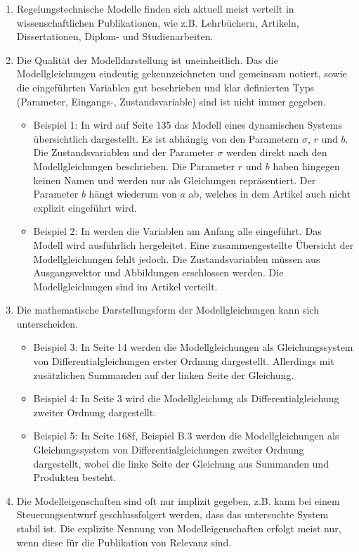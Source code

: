 \begin{enumerate}
	\item Regelungstechnische Modelle finden sich aktuell meist verteilt in wissenschaftlichen Publikationen, wie z.B. Lehrbüchern, Artikeln, Dissertationen, Diplom- und Studienarbeiten.
	\item Die Qualität der Modelldarstellung ist uneinheitlich. Das die Modellgleichungen eindeutig gekennzeichneten und gemeinsam notiert, sowie die eingeführten Variablen gut beschrieben und klar definierten Typs (Parameter, Eingangs-, Zustandsvariable) sind ist nicht immer gegeben.
	\begin{itemize}[label=$\bullet$]
		\item Beispiel 1: In \cite{LOR63} wird auf Seite 135 das Modell eines dynamischen Systems übersichtlich dargestellt. Es ist abhängig von den Parametern $\sigma$, $r$ und $b$. Die Zustandsvariablen und der Parameter $\sigma$ werden direkt nach den Modellgleichungen beschrieben. Die Parameter $r$ und $b$ haben hingegen keinen Namen und werden nur als Gleichungen repräsentiert. Der Parameter $b$ hängt wiederum von $a$ ab, welches in dem Artikel auch nicht explizit eingeführt wird.
		\item Beispiel 2: In \cite{YIFREA09} werden die Variablen am Anfang alle eingeführt. Das Modell wird ausführlich hergeleitet. Eine zusammengestellte Übersicht der Modellgleichungen fehlt jedoch. Die Zustandsvariablen müssen aus Ausgangsvektor und Abbildungen erschlossen werden. Die Modellgleichungen sind im Artikel verteilt.
	\end{itemize}
	\item Die mathematische Darstellungsform der Modellgleichungen kann sich unterscheiden.
	\begin{itemize}[label=$\bullet$]
		\item Beispiel 3: In \cite{SILEEA12} Seite 14 werden die Modellgleichungen als Gleichungssystem von Differentialgleichungen erster Ordnung dargestellt. Allerdings mit zusätzlichen Summanden auf der linken Seite der Gleichung.
		\item Beispiel 4: In \cite{BUT21} Seite 3 wird die Modellgleichung als Differentialgleichung zweiter Ordnung dargestellt.
		\item Beispiel 5: In \cite{KNO16} Seite 168f, Beispiel B.3 werden die Modellgleichungen als Gleichungssystem von Differentialgleichungen zweiter Ordnung dargestellt, wobei die linke Seite der Gleichung aus Summanden und Produkten besteht.
	\end{itemize}
	\item  Die Modelleigenschaften sind oft nur implizit gegeben, z.B. kann bei einem Steuerungsentwurf geschlussfolgert werden, dass das untersuchte System stabil ist. Die explizite Nennung von Modelleigenschaften erfolgt meist nur, wenn diese für die Publikation von Relevanz sind. 

\end{enumerate}

